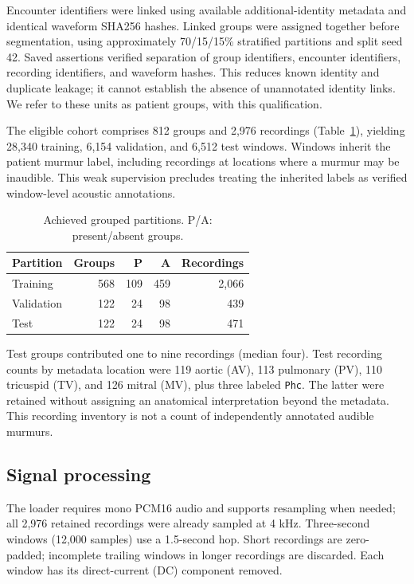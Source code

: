 \documentclass[9pt,twocolumn,twoside,lineno]{MSBJournal}
\begin{document}
Encounter identifiers were linked using available additional-identity metadata and identical waveform SHA256 hashes. Linked groups were assigned together before segmentation, using approximately 70/15/15\% stratified partitions and split seed 42. Saved assertions verified separation of group identifiers, encounter identifiers, recording identifiers, and waveform hashes. This reduces known identity and duplicate leakage; it cannot establish the absence of unannotated identity links. We refer to these units as patient groups, with this qualification.

The eligible cohort comprises 812 groups and 2,976 recordings (Table~\ref{tab:split}), yielding 28,340 training, 6,154 validation, and 6,512 test windows. Windows inherit the patient murmur label, including recordings at locations where a murmur may be inaudible. This weak supervision precludes treating the inherited labels as verified window-level acoustic annotations.
\begin{table}[t]
\centering
\caption{Achieved grouped partitions. P/A: present/absent groups.}
\label{tab:split}
\begin{tabular}{lrrrr}
\toprule
Partition & Groups & P & A & Recordings\\
\midrule
Training & 568 & 109 & 459 & 2,066\\
Validation & 122 & 24 & 98 & 439\\
Test & 122 & 24 & 98 & 471\\
\bottomrule
\end{tabular}
\end{table}
Test groups contributed one to nine recordings (median four). Test recording counts by metadata location were 119 aortic (AV), 113 pulmonary (PV), 110 tricuspid (TV), and 126 mitral (MV), plus three labeled \texttt{Phc}. The latter were retained without assigning an anatomical interpretation beyond the metadata. This recording inventory is not a count of independently annotated audible murmurs.

\subsection{Signal processing}
The loader requires mono PCM16 audio and supports resampling when needed; all 2,976 retained recordings were already sampled at 4 kHz. Three-second windows (12,000 samples) use a 1.5-second hop. Short recordings are zero-padded; incomplete trailing windows in longer recordings are discarded. Each window has its direct-current (DC) component removed.
\end{document}

